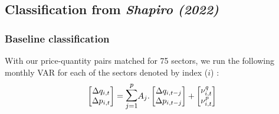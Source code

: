 \subsection{Classification from \textit{Shapiro (2022)}}
\subsubsection{Baseline classification}

\quad With our price-quantity pairs matched for 75 sectors, we run the following monthly VAR for each of the sectors denoted by index ($i$) :
\begin{align*}
    \begin{bmatrix} \Delta q_{i,t} \\ \Delta p_{i,t} \end{bmatrix} = \mathlarger{\mathlarger{\sum}}_{j=1}^{p}A_{j}.\begin{bmatrix} \Delta q_{i,t-j} \\ \Delta p_{i,t-j} \end{bmatrix} + \begin{bmatrix} \nu_{i,t}^{q} \\ \nu_{i,t}^{p} \end{bmatrix}\;
\end{align*}

